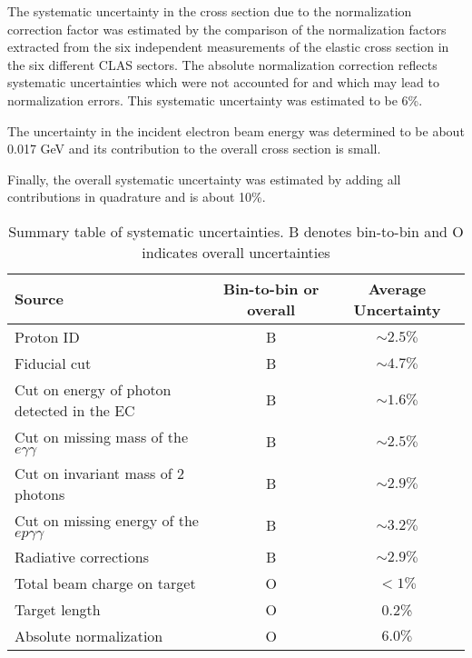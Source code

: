 \documentclass[prc,floatfix,twocolumn,superscriptaddress,letter]{revtex4}
\begin{document}
 The systematic uncertainty in the cross section due to the normalization correction factor was estimated by the comparison of the normalization factors extracted from the six independent measurements of the elastic cross section in the six different CLAS sectors. 
The absolute normalization correction reflects systematic uncertainties which were not accounted for and which may lead to normalization errors. This systematic uncertainty  was estimated to be 6\%.

The uncertainty in the incident electron beam energy  was determined to be about  0.017 GeV and
its contribution to the overall cross section is small.


Finally, the overall systematic uncertainty was estimated by adding all contributions in quadrature and is about 10\%.


\begingroup
\squeezetable
\begin{table*}
\caption{ Summary table of systematic uncertainties.  B denotes  bin-to-bin and O indicates overall uncertainties}
\centering
\begin{ruledtabular}
\begin{tabular}{lcc}
Source & Bin-to-bin or overall & Average Uncertainty \\
\hline 
Proton ID &B& $\sim 2.5 \%$ \\
Fiducial cut &B &$\sim  4.7\%$ \\
Cut on energy of photon detected in the EC & B & $\sim 1.6\%$ \\
Cut on missing mass of the $e\gamma\gamma$ & B& $\sim2.5\%$ \\
Cut on invariant mass of 2 photons & B& $\sim2.9\%$ \\
Cut on missing energy of the $ep\gamma\gamma$ & B & $\sim 3.2\%$ \\
Radiative corrections & B & $\sim 2.9\%$ \\
Total beam charge on target & O & $ < 1\%$  \\
Target length &  O & 0.2\% \\
Absolute normalization &  O  & $6.0\%$ \\
\end{tabular}
\end{ruledtabular}
\label{table:syst-summary}
\end{table*} 
\endgroup
\end{document}
